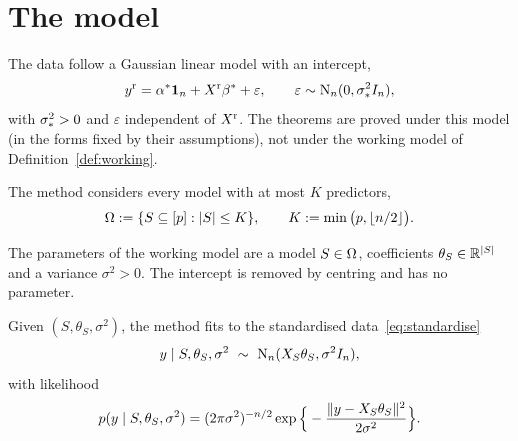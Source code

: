 \section{The model}\label{sec:method}

\begin{definition}\label{def:dgm}
The data follow a Gaussian linear model with an intercept,
\begin{equation}\label{eq:model}
  y^{\mathrm r}=\alpha^*\mathbf{1}_n+X^{\mathrm r}\beta^*+\varepsilon,\qquad \varepsilon\sim\mathrm{N}_n(0,\sigma_*^2I_n),
\end{equation}
with $\sigma_*^2>0$ and $\varepsilon$ independent of $X^{\mathrm r}$. The theorems are proved under this model (in the forms fixed by
their assumptions), not under the working model of Definition~\ref{def:working}.
\end{definition}

\begin{definition}\label{def:space}
The method considers every model with at most $K$ predictors,
\begin{equation}\label{eq:space}
  \Omega:=\{S\subseteq[p]:\lvert S\rvert\le K\},\qquad K:=\min\big(p,\lfloor n/2\rfloor\big).
\end{equation}
\end{definition}

\begin{definition}[Parameters]\label{def:params}
The parameters of the working model are a model $S\in\Omega$, coefficients $\theta_S\in\mathbb{R}^{\lvert S\rvert}$ and a variance
$\sigma^2>0$. The intercept is removed by centring and has no parameter.
\end{definition}

\begin{definition}\label{def:working}
Given $(S,\theta_S,\sigma^2)$, the method fits to the standardised data~\eqref{eq:standardise}
\[
  y\mid S,\theta_S,\sigma^2\ \sim\ \Normal_n(X_S\theta_S,\sigma^2I_n),
\]
with likelihood
\begin{equation}\label{eq:lik}
  p(y\mid S,\theta_S,\sigma^2)=(2\pi\sigma^2)^{-n/2}\exp\Big\{-\frac{\lVert y-X_S\theta_S\rVert^2}{2\sigma^2}\Big\}.
\end{equation}
\end{definition}
